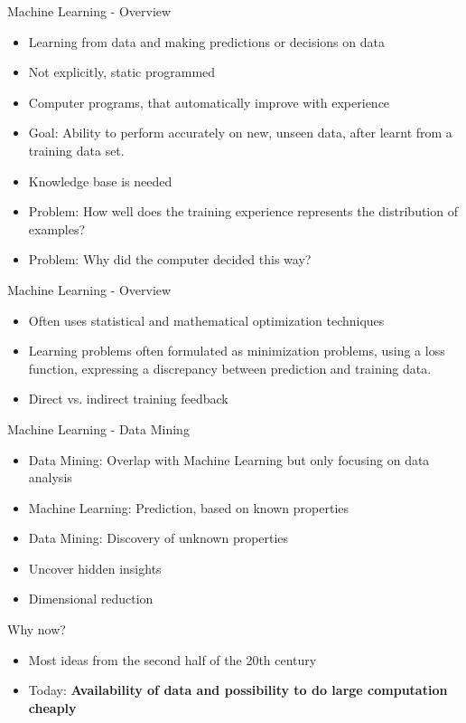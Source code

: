 \documentclass{beamer}
\begin{document}
	\begin{frame}{Machine Learning - Overview}
		\begin{itemize}
			\item Learning from data and making predictions or decisions on data
			\item Not explicitly, static programmed
			\item Computer programs, that automatically improve with experience
			\item Goal: Ability to perform accurately on new, unseen data, after learnt from a training data set.
			\item Knowledge base is needed
			\item Problem: How well does the training experience represents the distribution of examples?
			\item Problem: Why did the computer decided this way?
		\end{itemize}
	\end{frame}
	
	\begin{frame}{Machine Learning - Overview}
		\begin{itemize}
			\item Often uses statistical and mathematical optimization techniques
			\item Learning problems often formulated as minimization problems, using a loss function, expressing a discrepancy between prediction and training data.	
			\item Direct vs. indirect training feedback
		\end{itemize}
	\end{frame}
	
	\begin{frame}{Machine Learning - Data Mining}
		\begin{itemize}
			\item Data Mining: Overlap with Machine Learning but only focusing on data analysis
			\item Machine Learning: Prediction, based on known properties
			\item Data Mining: Discovery of unknown properties
			\item Uncover hidden insights
			\item Dimensional reduction
		\end{itemize}
	\end{frame}
	
	\begin{frame}{Why now?}
		\begin{itemize}
			\item Most ideas from the second half of the 20th century
			\item Today: \textbf{Availability of data and possibility to do large computation cheaply}
		\end{itemize}
	\end{frame}
	
\end{document}

